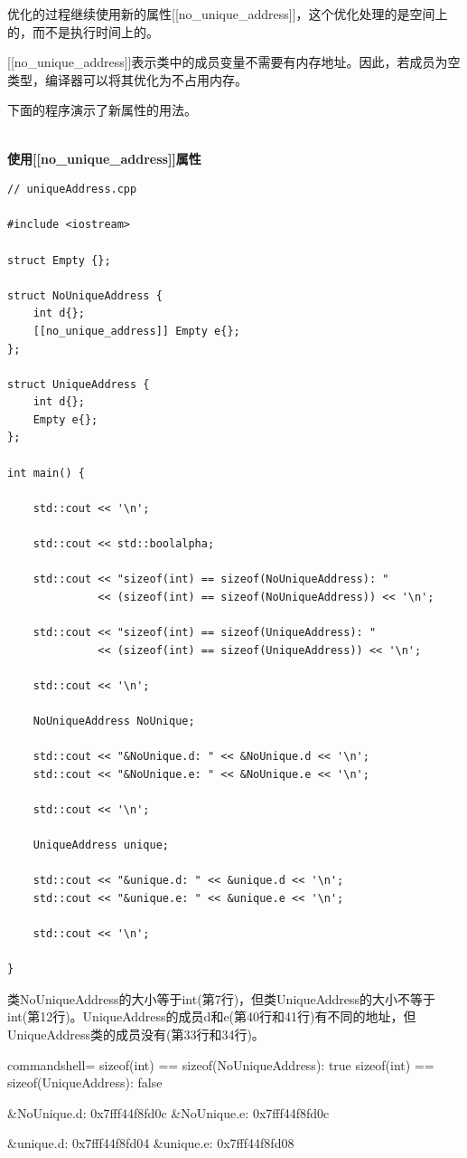 优化的过程继续使用新的属性[[no\_unique\_address]]，这个优化处理的是空间上的，而不是执行时间上的。


[[no\_unique\_address]]表示类中的成员变量不需要有内存地址。因此，若成员为空类型，编译器可以将其优化为不占用内存。

下面的程序演示了新属性的用法。

\hspace*{\fill} \\ %
\noindent
\textbf{使用[[no\_unique\_address]]属性}
\begin{lstlisting}[style=styleCXX]
// uniqueAddress.cpp

#include <iostream>

struct Empty {};

struct NoUniqueAddress {
	int d{};
	[[no_unique_address]] Empty e{};
};

struct UniqueAddress {
	int d{};
	Empty e{};
};

int main() {

	std::cout << '\n';
	
	std::cout << std::boolalpha;
	
	std::cout << "sizeof(int) == sizeof(NoUniqueAddress): "
			  << (sizeof(int) == sizeof(NoUniqueAddress)) << '\n';
	
	std::cout << "sizeof(int) == sizeof(UniqueAddress): "
			  << (sizeof(int) == sizeof(UniqueAddress)) << '\n';
	
	std::cout << '\n';
	
	NoUniqueAddress NoUnique;
	
	std::cout << "&NoUnique.d: " << &NoUnique.d << '\n';
	std::cout << "&NoUnique.e: " << &NoUnique.e << '\n';
	
	std::cout << '\n';
	
	UniqueAddress unique;
	
	std::cout << "&unique.d: " << &unique.d << '\n';
	std::cout << "&unique.e: " << &unique.e << '\n';
	
	std::cout << '\n';

}
\end{lstlisting}

类NoUniqueAddress的大小等于int(第7行)，但类UniqueAddress的大小不等于int(第12行)。UniqueAddress的成员d和e(第40行和41行)有不同的地址，但UniqueAddress类的成员没有(第33行和34行)。

\begin{tcblisting}{commandshell={}}
sizeof(int) == sizeof(NoUniqueAddress): true
sizeof(int) == sizeof(UniqueAddress): false

&NoUnique.d: 0x7fff44f8fd0c
&NoUnique.e: 0x7fff44f8fd0c

&unique.d: 0x7fff44f8fd04
&unique.e: 0x7fff44f8fd08
\end{tcblisting}

